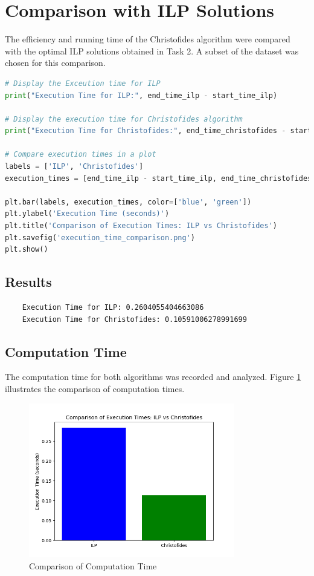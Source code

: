 \section*{Comparison with ILP Solutions}

The efficiency and running time of the Christofides algorithm were compared with the optimal ILP solutions obtained in Task 2. A subset of the dataset was chosen for this comparison.
\begin{center}
    \begin{lstlisting}[language=Python, caption={CCompare execution times in a plot}]
        # Display the Exceution time for ILP   
print("Execution Time for ILP:", end_time_ilp - start_time_ilp)

# Display the execution time for Christofides algorithm
print("Execution Time for Christofides:", end_time_christofides - start_time_christofides)

# Compare execution times in a plot
labels = ['ILP', 'Christofides']
execution_times = [end_time_ilp - start_time_ilp, end_time_christofides - start_time_christofides]

plt.bar(labels, execution_times, color=['blue', 'green'])
plt.ylabel('Execution Time (seconds)')
plt.title('Comparison of Execution Times: ILP vs Christofides')
plt.savefig('execution_time_comparison.png')
plt.show()
    \end{lstlisting}
\end{center}
\newpage
\subsection*{Results}
\begin{verbatim}
    Execution Time for ILP: 0.2604055404663086
    Execution Time for Christofides: 0.10591006278991699
\end{verbatim}
\subsection*{Computation Time}

The computation time for both algorithms was recorded and analyzed. Figure \ref{fig:comptime} illustrates the comparison of computation times.

\begin{figure}[H]
    \centering
    \includegraphics[width=0.8\textwidth]{Chapters/execution_time_comparison.png}
    \caption{Comparison of Computation Time}
    \label{fig:comptime}
\end{figure}

